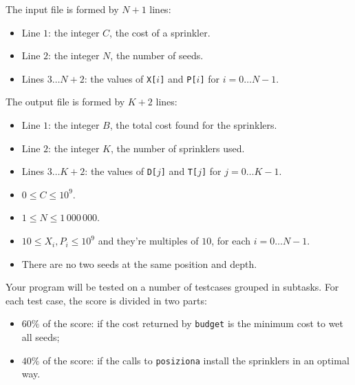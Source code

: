 The input file is formed by $N+1$ lines:
\begin{itemize}[nolistsep,itemsep=2mm]
\item Line $1$: the integer $C$, the cost of a sprinkler.
\item Line $2$: the integer $N$, the number of seeds.
\item Lines $3\ldots N+2$: the values of \texttt{X[$i$]} and \texttt{P[$i$]} for
$i = 0\ldots N-1$.
\end{itemize}

The output file is formed by $K+2$ lines:
\begin{itemize}[nolistsep,itemsep=2mm]
\item Line $1$: the integer $B$, the total cost found for the sprinklers.
\item Line $2$: the integer $K$, the number of sprinklers used.
\item Lines $3\ldots K+2$: the values of \texttt{D[$j$]} and \texttt{T[$j$]} for
$j = 0\ldots K-1$.
\end{itemize}



\Constraints

\begin{itemize}[nolistsep, itemsep=2mm]
	\item $0 \le C \le 10^9$.
	\item $1 \le N \le 1\,000\,000$.
	\item $10 \le X_i, P_i \le 10^9$ and they're multiples of $10$, for each
	$i=0\ldots N-1$.
	\item There are no two seeds at the same position and depth.
\end{itemize}


\pagebreak

\Scoring

Your program will be tested on a number of testcases grouped in subtasks. For
each test case, the score is divided in two parts:

\begin{itemize}[nolistsep,itemsep=2mm]
  \item $60\%$ of the score: if the cost returned by \verb|budget| is the minimum cost to wet all seeds;
  \item $40\%$ of the score: if the calls to \verb|posiziona| install the sprinklers in an optimal way.
\end{itemize}

